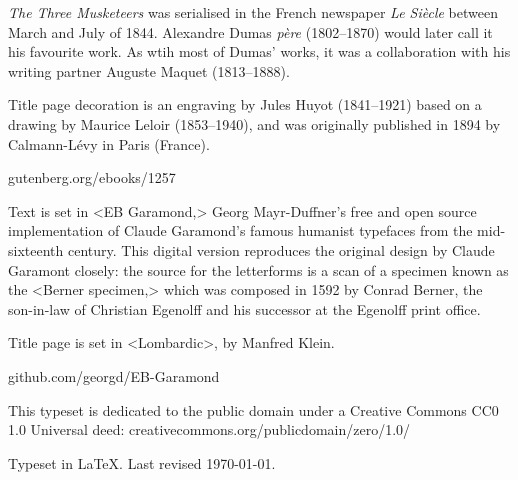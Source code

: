 \documentclass[
a5paper,
]{scrbook}
\begin{document}
\vfill
\begin{minipage}{\textwidth}
\textit{The Three Musketeers} was serialised in the French newspaper \textit{Le Siècle} between March and July of 1844. Alexandre Dumas \textit{père} (1802--1870) would later call it his favourite work. As wtih most of Dumas' works, it was a collaboration with his writing partner Auguste Maquet (1813--1888).

Title page decoration is an engraving by Jules Huyot (1841--1921) based on a drawing by Maurice Leloir (1853--1940), and was originally published in 1894 by Calmann-Lévy in Paris (France).

\end{minipage}
\vfill
gutenberg.org/ebooks/1257
\vfill
\divider
\vfill
\begin{minipage}{\textwidth}
Text is set in <EB Garamond,> Georg Mayr-Duffner's free and open source implementation of Claude Garamond’s famous humanist typefaces from the mid-sixteenth century. This digital version reproduces the original design by Claude Garamont closely: the source for the letterforms is a scan of a specimen known as the <Berner specimen,> which was composed in 1592 by Conrad Berner, the son-in-law of Christian Egenolff and his successor at the Egenolff print office.

Title page is set in <Lombardic>, by Manfred Klein.
\end{minipage}
\vfill
github.com/georgd/EB-Garamond
\vfill
\divider
\vfill
\begin{minipage}{\textwidth}
This typeset is dedicated to the public domain under a Creative Commons CC0 1.0 Universal deed: creativecommons.org/publicdomain/zero/1.0/\\
\end{minipage}
\vfill
\divider
\vfill
Typeset in \LaTeX{}. Last revised \today.
\thispagestyle{empty}
\end{document}
